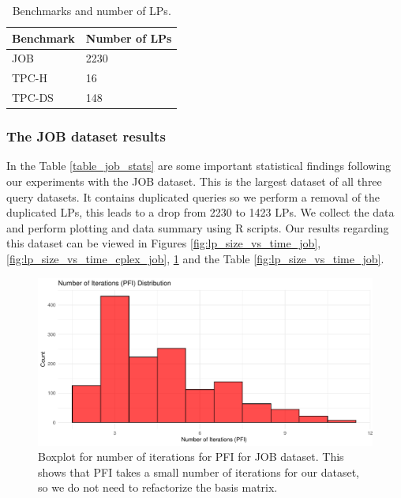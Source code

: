 \begin{table}[!htb]
    \centering
    \caption{Benchmarks and number of LPs.}
    \begin{tabular}{|l|l|}
        \hline
        Benchmark                                & Number of LPs \\
        \hline
        JOB \parencite{10.14778/2850583.2850594} & 2230          \\
        TPC-H \parencite{tpch}                   & 16            \\
        TPC-DS \parencite{tpcds2022}             & 148           \\
        \hline
    \end{tabular}
    \label{job_tpch_tpcds}
\end{table}

\subsubsection{The JOB dataset results}
In the Table \ref{table_job_stats} are some important statistical findings following our
experiments with the JOB dataset.
This is the largest dataset of all three query datasets. It contains duplicated queries so we
perform a removal of the duplicated LPs, this leads to a drop from 2230 to 1423 LPs. We collect the data and perform plotting and data summary using R scripts. Our results regarding this dataset can be viewed in Figures \ref{fig:lp_size_vs_time_job}, \ref{fig:lp_size_vs_time_cplex_job}, \ref{fig:num_iter_boxplot_pfi_job} and the Table \ref{fig:lp_size_vs_time_job}.

\begin{figure}[!htb]
    \centering
    \includegraphics[width=\textwidth]{figures/histo_iter_pfi.pdf}
    \caption{Boxplot for number of iterations for PFI for JOB dataset. This shows that PFI takes a small number of iterations for our dataset, so we do not need to refactorize the basis matrix.}
    \label{fig:num_iter_boxplot_pfi_job}
\end{figure}


